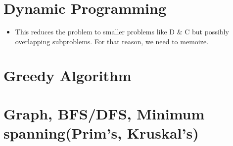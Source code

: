 \documentclass{article}
\theoremstyle{remark}
\begin{document}
\section{Dynamic Programming}
\begin{itemize}
\item This reduces the problem to smaller problems like D \& C
but possibly overlapping subproblems. For that reason, we need to memoize.
\end{itemize}
\section{Greedy Algorithm}

\section{Graph, BFS/DFS, Minimum spanning(Prim's, Kruskal's)}
\end{document}

